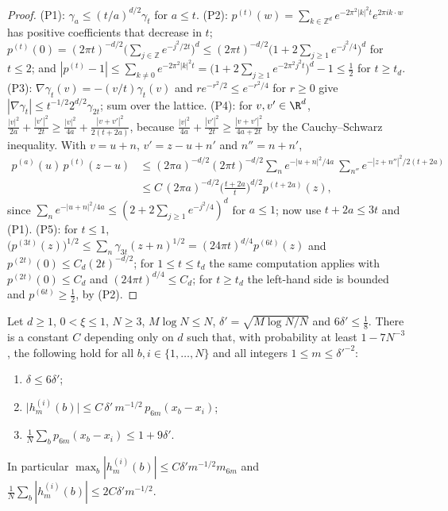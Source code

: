\begin{proof}
(P1): $\gamma_a\le(t/a)^{d/2}\gamma_t$ for $a\le t$. (P2): $p^{(t)}(w)=\sum_{k\in\mathbb Z^d}e^{-2\pi^2|k|^2t}e^{2\pi ik\cdot w}$ has positive coefficients that decrease in $t$; $p^{(t)}(0)=(2\pi t)^{-d/2}\big(\sum_{j\in\mathbb Z}e^{-j^2/2t}\big)^d\le(2\pi t)^{-d/2}\big(1+2\sum_{j\ge1}e^{-j^2/4}\big)^d$ for $t\le2$; and $|p^{(t)}-1|\le\sum_{k\ne0}e^{-2\pi^2|k|^2t}=\big(1+2\sum_{j\ge1}e^{-2\pi^2j^2t}\big)^d-1\le\frac12$ for $t\ge t_d$. (P3): $\nabla\gamma_t(v)=-(v/t)\gamma_t(v)$ and $re^{-r^2/2}\le e^{-r^2/4}$ for $r\ge0$ give $|\nabla\gamma_t|\le t^{-1/2}2^{d/2}\gamma_{2t}$; sum over the lattice. (P4): for $v,v'\in\R^d$, $\frac{|v|^2}{2a}+\frac{|v'|^2}{2t}\ge\frac{|v|^2}{4a}+\frac{|v+v'|^2}{2(t+2a)}$, because $\frac{|v|^2}{4a}+\frac{|v'|^2}{2t}\ge\frac{|v+v'|^2}{4a+2t}$ by the Cauchy--Schwarz inequality. With $v=u+n$, $v'=z-u+n'$ and $n''=n+n'$,
\[
\begin{aligned}
p^{(a)}(u)\,p^{(t)}(z-u)&\le(2\pi a)^{-d/2}(2\pi t)^{-d/2}\sum_ne^{-|u+n|^2/4a}\ \sum_{n''}e^{-|z+n''|^2/2(t+2a)}\\
&\le C\,(2\pi a)^{-d/2}\Big(\frac{t+2a}{t}\Big)^{d/2}p^{(t+2a)}(z),
\end{aligned}
\]
since $\sum_ne^{-|u+n|^2/4a}\le(2+2\sum_{j\ge1}e^{-j^2/4})^d$ for $a\le1$; now use $t+2a\le3t$ and (P1). (P5): for $t\le1$, $\big(p^{(3t)}(z)\big)^{1/2}\le\sum_n\gamma_{3t}(z+n)^{1/2}=(24\pi t)^{d/4}p^{(6t)}(z)$ and $p^{(2t)}(0)\le C_d(2t)^{-d/2}$; for $1\le t\le t_d$ the same computation applies with $p^{(2t)}(0)\le C_d$ and $(24\pi t)^{d/4}\le C_d$; for $t\ge t_d$ the left-hand side is bounded and $p^{(6t)}\ge\frac12$, by (P2).
\end{proof}

\begin{lemma}\label{lem:consistency}
Let $d\ge1$, $0<\xi\le1$, $N\ge3$, $M\log N\le N$, $\delta'=\sqrt{M\log N/N}$ and $6\delta'\le\frac18$. There is a constant $C$ depending only on $d$ such that, with probability at least $1-7N^{-3}$, the following hold for all $b,i\in\{1,\dots,N\}$ and all integers $1\le m\le\delta'^{-2}$:
\begin{enumerate}[label=\textup{(\roman*)}]
\item $\delta\le6\delta'$;
\item $\big|h^{(i)}_m(b)\big|\le C\,\delta'\,m^{-1/2}\,p_{6m}(x_b-x_i)$;
\item $\frac1N\sum_bp_{6m}(x_b-x_i)\le1+9\delta'$.
\end{enumerate}
In particular $\max_b|h^{(i)}_m(b)|\le C\delta'm^{-1/2}m_{6m}$ and $\frac1N\sum_b|h^{(i)}_m(b)|\le2C\delta'm^{-1/2}$.
\end{lemma}


